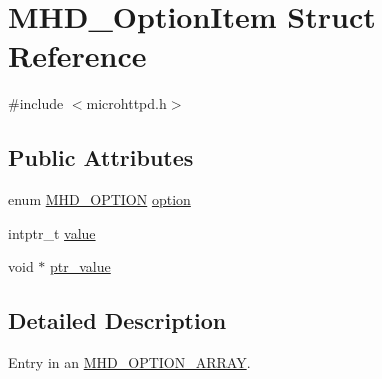 \hypertarget{structMHD__OptionItem}{\section{\-M\-H\-D\-\_\-\-Option\-Item \-Struct \-Reference}
\label{structMHD__OptionItem}
}


{\ttfamily \#include $<$microhttpd.\-h$>$}

\subsection*{\-Public \-Attributes}
\begin{DoxyCompactItemize}
\item 
enum \hyperlink{microhttpd_8h_a159aba015765dbe1096c8726a18ff250}{\-M\-H\-D\-\_\-\-O\-P\-T\-I\-O\-N} \hyperlink{structMHD__OptionItem_a69a1d5ea39bc8c7c2c31605825af1678}{option}
\item 
intptr\-\_\-t \hyperlink{structMHD__OptionItem_a5bd8b630776416a694acca0f401a1c2f}{value}
\item 
void $\ast$ \hyperlink{structMHD__OptionItem_aed7ca1850f1fdc0a8b45573fbb4f7e24}{ptr\-\_\-value}
\end{DoxyCompactItemize}


\subsection{\-Detailed \-Description}
\-Entry in an \hyperlink{microhttpd_8h_a159aba015765dbe1096c8726a18ff250ad32e5ae3bfe8e3f00597d69007a85d51}{\-M\-H\-D\-\_\-\-O\-P\-T\-I\-O\-N\-\_\-\-A\-R\-R\-A\-Y}. 

